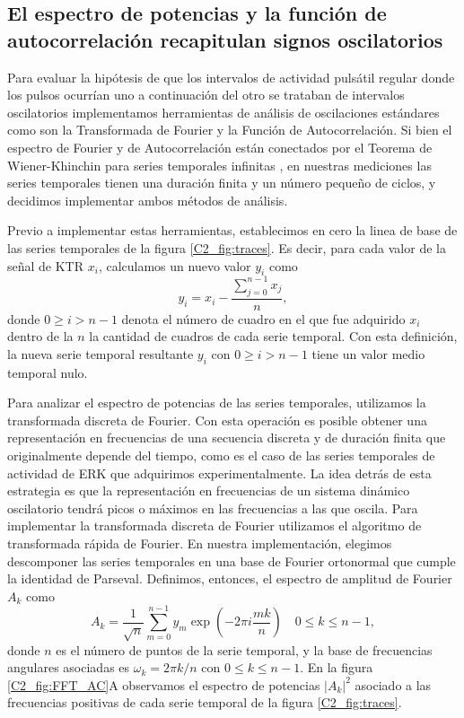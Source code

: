 \documentclass[./main.tex]{subfiles}
\begin{document}
\subsection{El espectro de potencias y la función de autocorrelación recapitulan signos oscilatorios}


Para evaluar la hipótesis de que los intervalos de actividad pulsátil regular donde los pulsos ocurrían uno a continuación del otro se trataban de intervalos oscilatorios implementamos herramientas de análisis de oscilaciones estándares como son la Transformada de Fourier y la Función de Autocorrelación. Si bien el espectro de Fourier y de Autocorrelación están conectados por el Teorema de Wiener-Khinchin para series temporales infinitas \cite{Gardiner}, en nuestras mediciones las series temporales tienen una duración finita y un número pequeño de ciclos, y decidimos implementar ambos métodos de análisis. 


Previo a implementar estas herramientas, establecimos en cero la linea de base de las series temporales de la figura \ref{C2_fig:traces}. Es decir, para cada valor de la señal de KTR $x_i$, calculamos un nuevo valor $y_i$ como
\begin{equation}
    y_i = x_i - \frac{\sum_{j=0}^{n-1} x_j}{n},
    \label{C2_eq:base_cero}
\end{equation}
donde $0 \geq i > n-1$ denota el número de cuadro en el que fue adquirido $x_i$ dentro de la $n$ la cantidad de cuadros de cada serie temporal. Con esta definición, la nueva serie temporal resultante $y_i$ con $0 \geq i > n-1$ tiene un valor medio temporal nulo.


Para analizar el espectro de potencias de las series temporales, utilizamos la transformada discreta de Fourier. Con esta operación es posible obtener una representación en frecuencias de una secuencia discreta y de duración finita que originalmente depende del tiempo, como es el caso de las series temporales de actividad de ERK que adquirimos experimentalmente. La idea detrás de esta estrategia es que la representación en frecuencias de un sistema dinámico oscilatorio tendrá picos o máximos en las frecuencias a las que oscila. Para implementar la transformada discreta de Fourier utilizamos el algoritmo de transformada rápida de Fourier. En nuestra implementación, elegimos descomponer las series temporales en una base de Fourier ortonormal que cumple la identidad de Parseval. Definimos, entonces, el espectro de amplitud de Fourier $A_k$ como \cite{Harris2020}
\begin{equation}
   A_k = \frac{1}{\sqrt{n}} \sum_{m=0}^{n-1} y_m \exp{(-2\pi i \frac{mk}{n})} \quad 0 \leq k \leq n-1,
   \label{C2_eq:amplitud_fourier}
\end{equation}
donde $n$ es el número de puntos de la serie temporal, y la base de frecuencias angulares asociadas es $\omega_k = 2\pi k/n$ con $0 \leq k \leq n-1$. En la figura \ref{C2_fig:FFT_AC}A observamos el espectro de potencias $|A_k|^2$ asociado a las frecuencias positivas de cada serie temporal de la figura \ref{C2_fig:traces}. 
\end{document}
